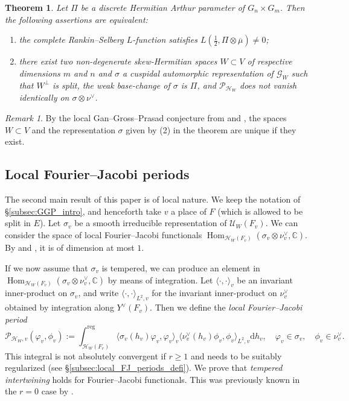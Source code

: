 \documentclass[letterpaper,11pt]{amsart}
\newcommand{\C}{\mathbb{C}}
\newcommand{\cG}{\mathcal{G}}
\newcommand{\cH}{\mathcal{H}}
\newcommand{\cP}{\mathcal{P}}
\newcommand{\cU}{\mathcal{U}}
\newcommand{\rd}{\mathrm{d}}
\newcommand{\<}{\negthickspace}
\DeclareMathOperator{\Hom}{Hom}
\theoremstyle{definition}
\theoremstyle{plain}
\newtheorem{theorem}[definition]{Theorem}
\theoremstyle{remark}
\newtheorem{remark}[definition]{Remark}
\numberwithin{equation}{section}
\begin{document}
\begin{theorem}
    \label{thm:GGP}
Let $\Pi$ be a discrete Hermitian Arthur parameter of $G_n \times G_m$. Then the following assertions are equivalent:
    \begin{enumerate}
        \item the complete Rankin--Selberg $L$-function satisfies $L(\frac{1}{2}, \Pi \otimes \overline{\mu}) \neq 0$;
        \item there exist two non-degenerate skew-Hermitian spaces $W\subset V$ of respective dimensions $m$ and $n$ and $\sigma$ a cuspidal automorphic representation of $\cG_{W}$ such that $W^\perp$ is split, the weak base-change of $\sigma$ is $\Pi$, and $\cP_{\cH_{W}}$ does not vanish identically on $\sigma \otimes \nu^\vee$.
    \end{enumerate}
\end{theorem}

\begin{remark}
By the local Gan--Gross--Prasad conjecture from \cite{GI2} and \cite{Xue6}, the spaces $W \subset V$ and the representation $\sigma$ given by (2) in the theorem are unique if they exist.
\end{remark}

\subsection{Local Fourier--Jacobi periods}

The second main result of this paper is of local nature. We keep the notation of \S\ref{subsec:GGP_intro}, and henceforth take $v$ a place of $F$ (which is allowed to be split in $E$). Let $\sigma_v$ be a smooth irreducible representation of $\cU_W(F_v)$. We can consider the space of local Fourier--Jacobi functionals $\Hom_{\cH_W(F_v)}(\sigma_v \otimes \nu^\vee_v,\C)$. By \cite{GGP} and \cite{LiuSun}, it is of dimension at most $1$.

If we now assume that $\sigma_v$ is tempered, we can produce an element in $\Hom_{\cH_W(F_v)}(\sigma_v \otimes \nu^\vee_v,\C)$ by means of integration. Let $\langle \cdot,\cdot\rangle_v$ be an invariant inner-product on $\sigma_v$, and write $\langle \cdot, \cdot \rangle_{L^2,v}$ for the invariant inner-product on $\nu_v^\vee$ obtained by integration along $Y^\vee(F_v)$. Then we define the \emph{local Fourier--Jacobi period} 
\begin{equation*}
    \cP_{\cH_W,v}(\varphi_v,\phi_v):=\int_{\cH_W(F_v)}^{\mathrm{reg}} \langle \sigma_v(h_v) \varphi_v,\varphi_v \rangle_v \langle \nu_v^\vee(h_v) \phi_v,\phi_v \rangle_{L^2,v} \rd h_v, \quad \varphi_v \in \sigma_v, \quad \phi_v \in \nu_v^\vee.
\end{equation*}
This integral is not absolutely convergent if $r \geq 1$ and needs to be suitably regularized (see \S\ref{subsec:local_FJ_periods_defi}). We prove that \emph{tempered intertwining} holds for Fourier--Jacobi functionals. This was previously known in the $r=0$ case by \cite{Xue2}.
\end{document}
